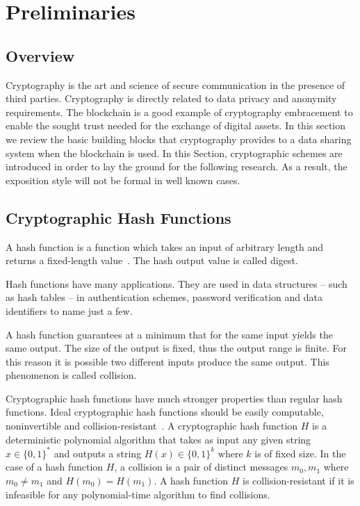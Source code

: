 \chapter{Preliminaries}
\label{preliminaries}

\section{Overview}
\label{preliminaries:overview}

Cryptography is the art and science of secure communication in the presence of third parties. Cryptography is directly related to data privacy and anonymity requirements. The blockchain is a good example of cryptography embracement to enable the sought trust needed for the exchange of digital assets. In this section we review the basic building blocks that cryptography provides to a data sharing system when the blockchain is used. In this Section, cryptographic schemes are introduced in order to lay the ground for the following research. As a result, the exposition style will not be formal in well known cases.

\section{Cryptographic Hash Functions}
\label{preliminaries:hash}

A hash function is a function which takes an input of arbitrary length and returns a fixed-length value~\cite{crypto_101,boneh_crypto,kiagias:crypto,Katz:2014:IMC:2700550}. The hash output value is called digest.

Hash functions have many applications. They are used in data structures -- such as hash tables -- in authentication schemes, password verification and data identifiers to name just a few.

A hash function guarantees at a minimum that for the same input yields the same output. The size of the output is fixed, thus the output range is finite. For this reason it is possible two different inputs produce the same output. This phenomenon is called collision.

Cryptographic hash functions have much stronger properties than regular hash functions. Ideal cryptographic hash functions should be easily computable, noninvertible and collision-resistant~\cite{Katz:2014:IMC:2700550, kiagias:crypto, crypto_101}. A cryptographic hash function $H$ is a deterministic polynomial algorithm that takes as input any given string $x \in \{0, 1\}^{*}$ and outputs a string $H(x) \in \{0, 1\}^{k}$ where $k$ is of fixed size. In the case of a hash function $H$, a collision is a pair of distinct messages $m_0, m_1$ where $m_0 \neq m_1$ and $H(m_0) = H(m_1)$. A hash function $H$ is collision-resistant if it is infeasible for any polynomial-time algorithm to find collisions.

